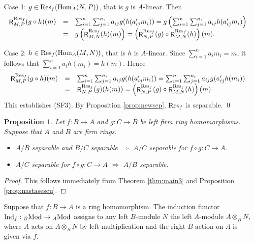 \documentclass[12pt]{amsart}
\newtheorem{prop}[thm]{Proposition}
\theoremstyle{definition}
\newcommand{\Mod}{{\rm Mod}}
\newcommand{\Hom}{{\rm Hom}}
\newcommand{\Res}{{\rm Res}}
\newcommand{\Ind}{{\rm Ind}}
\DeclareMathOperator{\R}{\mathsf R}
\begin{document}
Case 1: $g \in \Res_f(\Hom_A(N,P))$,
that is $g$ is $A$-linear. Then
\[
\begin{array}{rcl}
\R_{M,P}^{\Res_f}(g \circ h)(m)    
&=& \sum_{i=1}^n \sum_{j=1}^{n_i}
a_{ij} g( h(a_{ij}' m_i))  
= g \left( \sum_{i=1}^n \sum_{j=1}^{n_i}
a_{ij} h(a_{ij}' m_i) \right) \\
&=& g \left( \R_{M,N}^{\Res_f}(h)(m) \right)
= \left( \R_{N,P}^{\Res_f}(g) \circ 
\R_{M,N}^{\Res_f}(h) \right)(m).
\end{array}
\]

Case 2: $h \in \Res_f(\Hom_A(M,N))$,
that is $h$ is $A$-linear.
Since $\sum_{i=1}^n a_i m_i = m$, 
it follows that 
$\sum_{i=1}^n a_i h(m_i) = h(m)$. Hence
\[
\begin{array}{rcl}
\R_{M,P}^{\Res_f}(g \circ h)(m)    
&=& \sum_{i=1}^n \sum_{j=1}^{n_i}
a_{ij} g( h(a_{ij}' m_i))  
= \sum_{i=1}^n \sum_{j=1}^{n_i}
a_{ij} g(a_{ij}' h(m_i))  \\
&=& \R_{N,P}^{\Res_f}(g)(h(m)) 
= \left( \R_{N,P}^{\Res_f}(g) \circ 
\R_{M,N}^{\Res_f}(h) \right)(m).
\end{array}
\]
This establishes (SF3).
By Proposition \ref{prop:newsep},
$\Res_f$ is separable. \qed

\begin{prop}
Let $f : B \to A$ and $g : C \to B$ be left firm ring homomorphisms.
Suppose that $A$ and $B$ are firm rings.
\begin{itemize}[widest=(a)]

\item[{\rm (a)}]
$A/B$ separable and $B/C$ separable
$\Longrightarrow$
$A/C$ separable for $f \circ g : C \to A$.

\item[{\rm (b)}]
$A/C$ separable for $f \circ g : C \to A$
$\Longrightarrow$ $A/B$ separable.

\end{itemize}
\end{prop}

\begin{proof}
This follows immediately from 
Theorem \ref{thm:main3} and
Proposition \ref{prop:nastasescu}. 
\end{proof}

Suppose that \(f : B \to A\) is a ring 
homomorphism.  
The induction functor  
$\Ind_f : {}_B \Mod \to {}_A \Mod$
assigns to any left \(B\)-module \(N\) the left \(A\)-module \(A \otimes_B N\),
where \(A\) acts on \(A \otimes_B N\) by left multiplication
and the right \(B\)-action on \(A\) is given via \(f\).
\end{document}
